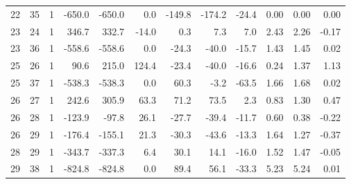 \documentclass[12pt]{classe_uftex/uftex}
\begin{document}
\begin{landscape}
\begin{longtable}{rrcrrrrrrrrr}
22 & 35 & 1 & -650.0 & -650.0 & 0.0 & -149.8 & -174.2 & -24.4 & 0.00 & 0.00 & 0.00 \\
23 & 24 & 1 & 346.7 & 332.7 & -14.0 & 0.3 & 7.3 & 7.0 & 2.43 & 2.26 & -0.17 \\
23 & 36 & 1 & -558.6 & -558.6 & 0.0 & -24.3 & -40.0 & -15.7 & 1.43 & 1.45 & 0.02 \\
25 & 26 & 1 & 90.6 & 215.0 & 124.4 & -23.4 & -40.0 & -16.6 & 0.24 & 1.37 & 1.13 \\
25 & 37 & 1 & -538.3 & -538.3 & 0.0 & 60.3 & -3.2 & -63.5 & 1.66 & 1.68 & 0.02 \\
26 & 27 & 1 & 242.6 & 305.9 & 63.3 & 71.2 & 73.5 & 2.3 & 0.83 & 1.30 & 0.47 \\
26 & 28 & 1 & -123.9 & -97.8 & 26.1 & -27.7 & -39.4 & -11.7 & 0.60 & 0.38 & -0.22 \\
26 & 29 & 1 & -176.4 & -155.1 & 21.3 & -30.3 & -43.6 & -13.3 & 1.64 & 1.27 & -0.37 \\
28 & 29 & 1 & -343.7 & -337.3 & 6.4 & 30.1 & 14.1 & -16.0 & 1.52 & 1.47 & -0.05 \\
29 & 38 & 1 & -824.8 & -824.8 & 0.0 & 89.4 & 56.1 & -33.3 & 5.23 & 5.24 & 0.01 \\
\end{longtable}
\end{landscape}
\normalsize
\end{document}
